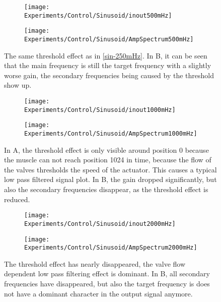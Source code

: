 \documentclass[main]{subfiles}
\begin{document}
\begin{figure}[H]
\begin{adjustwidth}{-8em}{-3em}
\begin{subfigure}[t]{0.665\textwidth}
\texttt{[image: Experiments/Control/Sinusoid/inout500mHz]}
\end{subfigure}\hspace{0.05\textwidth}
\begin{subfigure}[t]{0.6\textwidth}
\texttt{[image: Experiments/Control/Sinusoid/AmpSpectrum500mHz]}
\end{subfigure}
\end{adjustwidth}
\caption[Sinusoid control signal at 500mHz]{The same threshold effect as in \ref{sin-250mHz}. In B, it can be seen that the main frequency is still the target frequency with a slightly worse gain, the secondary frequencies being caused by the threshold show up.}
\label{sin-500mHz}
\end{figure}

\begin{figure}[H]
\begin{adjustwidth}{-8em}{-3em}
\begin{subfigure}[t]{0.665\textwidth}
\texttt{[image: Experiments/Control/Sinusoid/inout1000mHz]}
\end{subfigure}\hspace{0.05\textwidth}
\begin{subfigure}[t]{0.6\textwidth}
\texttt{[image: Experiments/Control/Sinusoid/AmpSpectrum1000mHz]}
\end{subfigure}
\end{adjustwidth}

\caption[Sinusoid control signal at 1Hz]{In A, the threshold effect is only visible around position 0 because the muscle can not reach position 1024 in time, because the flow of the valves thresholds the speed of the actuator. This causes a typical low pass filtered signal plot. In B, the gain dropped significantly, but also the secondary frequencies disappear, as the threshold effect is reduced.}
\label{sin-1000mHz}
\end{figure}

\begin{figure}[H]
\begin{adjustwidth}{-8em}{-3em}
\begin{subfigure}[t]{0.665\textwidth}
\texttt{[image: Experiments/Control/Sinusoid/inout2000mHz]}
\end{subfigure}\hspace{0.05\textwidth}
\begin{subfigure}[t]{0.6\textwidth}
\texttt{[image: Experiments/Control/Sinusoid/AmpSpectrum2000mHz]}
\end{subfigure}
\end{adjustwidth}
\caption[Sinusoid control signal at 2 Hz]{The threshold effect has nearly disappeared, the valve flow dependent low pass filtering effect is dominant. In B, all secondary frequencies have disappeared, but also the target frequency is does not have a dominant character in the output signal anymore.}
\label{sin-2000mHz}
\end{figure}
\end{document}
